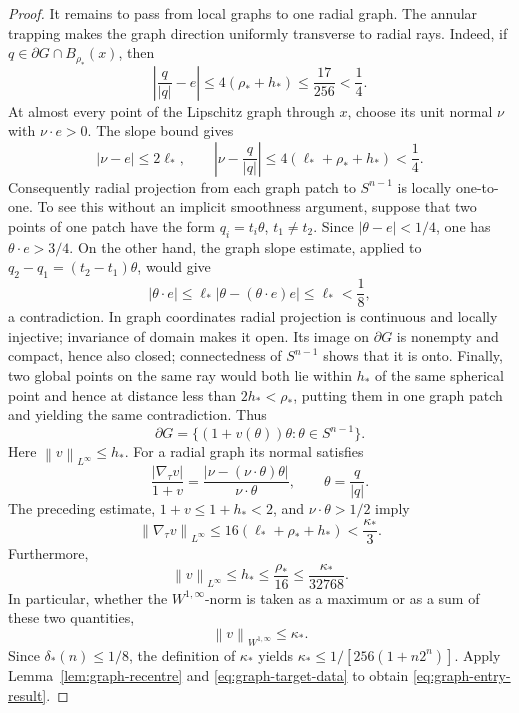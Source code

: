 \documentclass[11pt]{amsart}
\theoremstyle{definition}
\newcommand{\norm}[1]{\left\|#1\right\|}
\begin{document}
\begin{proof}
It remains to pass from local graphs to one radial graph.  The annular
trapping makes the graph direction uniformly transverse to radial rays.
Indeed, if \(q\in\partial G\cap B_{\rho_*}(x)\), then
\[
   \left|\frac{q}{|q|}-e\right|
      \le4(\rho_*+h_*)
      \le\frac{17}{256}<\frac14.
\]
At almost every point of the Lipschitz graph through \(x\), choose its
unit normal \(\nu\) with \(\nu\cdot e>0\).  The slope bound gives
\[
   |\nu-e|\le2\ell_*,
   \qquad
   \left|\nu-\frac{q}{|q|}\right|
      \le4(\ell_*+\rho_*+h_*)<\frac14.
\]
Consequently radial projection from each graph patch to \(S^{n-1}\)
is locally one-to-one.  To see this without an implicit smoothness
argument, suppose that two points of one patch have the form
\(q_i=t_i\theta\), \(t_1\ne t_2\).  Since
\(|\theta-e|<1/4\), one has \(\theta\cdot e>3/4\).  On the other hand,
the graph slope estimate, applied to \(q_2-q_1=(t_2-t_1)\theta\),
would give
\[
   |\theta\cdot e|
      \le \ell_*|\theta-(\theta\cdot e)e|
      \le\ell_*<\frac18,
\]
a contradiction.  In graph coordinates radial projection is
continuous and locally injective; invariance of domain makes it open.
Its image on \(\partial G\) is nonempty and compact, hence also closed;
connectedness of \(S^{n-1}\) shows that it is onto.  Finally, two
global points on the same ray would both lie within \(h_*\) of the
same spherical point and hence at distance less than
\(2h_*<\rho_*\), putting them in one graph patch and yielding the same
contradiction.  Thus
\[
   \partial G=\{(1+v(\theta))\theta:\theta\in S^{n-1}\}.
\]
Here \(\norm{v}_{L^\infty}\le h_*\).  For a radial graph its normal
satisfies
\[
   \frac{|\nabla_\tau v|}{1+v}
      =\frac{|\nu-(\nu\cdot\theta)\theta|}
             {\nu\cdot\theta},
   \qquad \theta=\frac{q}{|q|}.
\]
The preceding estimate, \(1+v\le1+h_*<2\), and
\(\nu\cdot\theta>1/2\) imply
\[
   \norm{\nabla_\tau v}_{L^\infty}
      \le16(\ell_*+\rho_*+h_*)
      <\frac{\kappa_*}{3}.
\]
Furthermore,
\[
   \norm{v}_{L^\infty}
      \le h_*\le\frac{\rho_*}{16}
      \le\frac{\kappa_*}{32768}.
\]
In particular, whether the \(W^{1,\infty}\)-norm is taken as a maximum
or as a sum of these two quantities,
\[
   \norm{v}_{W^{1,\infty}}\le\kappa_*.
\tag{4.95}\label{eq:pre-recentre-graph}
\]
Since \(\delta_*(n)\le1/8\), the definition of \(\kappa_*\) yields
\(\kappa_*\le1/[256(1+n2^n)]\).  Apply
Lemma~\ref{lem:graph-recentre} and
\eqref{eq:graph-target-data} to obtain
\eqref{eq:graph-entry-result}.
\end{proof}
\end{document}
